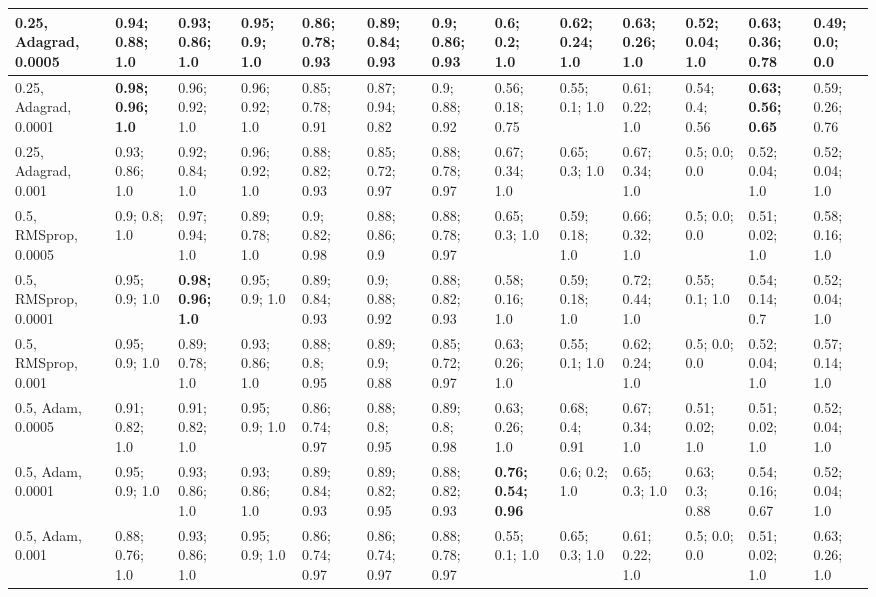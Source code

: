\documentclass{VUMIFPSbakalaurinis}
\begin{document}
\begin{longtable}{ | p{1.5cm} | p{1cm} | p{1cm} | p{1cm} | p{1cm} | p{1cm} | p{1cm} | p{1cm} | p{1cm} | p{1cm} | p{1cm} | p{1cm} | p{1cm} | }
    0.25, Adagrad, 0.0005 & 0.94; 0.88; 1.0 & 0.93; 0.86; 1.0 & 0.95; 0.9; 1.0    &  0.86; 0.78; 0.93 & 0.89; 0.84; 0.93 & 0.9; 0.86; 0.93   &  0.6; 0.2; 1.0 & 0.62; 0.24; 1.0 & 0.63; 0.26; 1.0               &  0.52; 0.04; 1.0 & 0.63; 0.36; 0.78 & 0.49; 0.0; 0.0  \\ \hline
    0.25, Adagrad, 0.0001 & \textbf{0.98; 0.96; 1.0} & 0.96; 0.92; 1.0 & 0.96; 0.92; 1.0   &  0.85; 0.78; 0.91 & 0.87; 0.94; 0.82 & 0.9; 0.88; 0.92   &  0.56; 0.18; 0.75 & 0.55; 0.1; 1.0 & 0.61; 0.22; 1.0    &  0.54; 0.4; 0.56 & \textbf{0.63; 0.56; 0.65} & 0.59; 0.26; 0.76  \\ \hline
    0.25, Adagrad, 0.001  & 0.93; 0.86; 1.0 & 0.92; 0.84; 1.0 & 0.96; 0.92; 1.0   &  0.88; 0.82; 0.93 & 0.85; 0.72; 0.97 & 0.88; 0.78; 0.97  &  0.67; 0.34; 1.0 & 0.65; 0.3; 1.0 & 0.67; 0.34; 1.0              &  0.5; 0.0; 0.0 & 0.52; 0.04; 1.0 & 0.52; 0.04; 1.0  \\ \hline
    0.5,  RMSprop, 0.0005  & 0.9; 0.8; 1.0 & 0.97; 0.94; 1.0 & 0.89; 0.78; 1.0     &  0.9; 0.82; 0.98 & 0.88; 0.86; 0.9 & 0.88; 0.78; 0.97   &  0.65; 0.3; 1.0 & 0.59; 0.18; 1.0 & 0.66; 0.32; 1.0              &  0.5; 0.0; 0.0 & 0.51; 0.02; 1.0 & 0.58; 0.16; 1.0  \\ \hline
    0.5,  RMSprop, 0.0001  & 0.95; 0.9; 1.0 & \textbf{0.98; 0.96; 1.0} & 0.95; 0.9; 1.0     &  0.89; 0.84; 0.93 & 0.9; 0.88; 0.92 & 0.88; 0.82; 0.93  &  0.58; 0.16; 1.0 & 0.59; 0.18; 1.0 & 0.72; 0.44; 1.0    &  0.55; 0.1; 1.0 & 0.54; 0.14; 0.7 & 0.52; 0.04; 1.0  \\ \hline
    0.5,  RMSprop, 0.001   & 0.95; 0.9; 1.0 & 0.89; 0.78; 1.0 & 0.93; 0.86; 1.0    &  0.88; 0.8; 0.95 & 0.89; 0.9; 0.88 & 0.85; 0.72; 0.97   &  0.63; 0.26; 1.0 & 0.55; 0.1; 1.0 & 0.62; 0.24; 1.0              &  0.5; 0.0; 0.0 & 0.52; 0.04; 1.0 & 0.57; 0.14; 1.0  \\ \hline
    0.5, Adam, 0.0005     & 0.91; 0.82; 1.0 & 0.91; 0.82; 1.0 & 0.95; 0.9; 1.0    &  0.86; 0.74; 0.97 & 0.88; 0.8; 0.95 & 0.89; 0.8; 0.98    &  0.63; 0.26; 1.0 & 0.68; 0.4; 0.91 & 0.67; 0.34; 1.0    &  0.51; 0.02; 1.0 & 0.51; 0.02; 1.0 & 0.52; 0.04; 1.0  \\ \hline
    0.5, Adam, 0.0001     & 0.95; 0.9; 1.0 & 0.93; 0.86; 1.0 & 0.93; 0.86; 1.0    &  0.89; 0.84; 0.93 & 0.89; 0.82; 0.95 & 0.88; 0.82; 0.93  &  \textbf{0.76; 0.54; 0.96} & 0.6; 0.2; 1.0 & 0.65; 0.3; 1.0      &  0.63; 0.3; 0.88 & 0.54; 0.16; 0.67 & 0.52; 0.04; 1.0  \\ \hline
    0.5, Adam, 0.001      & 0.88; 0.76; 1.0 & 0.93; 0.86; 1.0 & 0.95; 0.9; 1.0    &  0.86; 0.74; 0.97 & 0.86; 0.74; 0.97 & 0.88; 0.78; 0.97  &  0.55; 0.1; 1.0 & 0.65; 0.3; 1.0 & 0.61; 0.22; 1.0               &  0.5; 0.0; 0.0 & 0.51; 0.02; 1.0 & 0.63; 0.26; 1.0  \\ \hline

\end{longtable}
\end{document}
